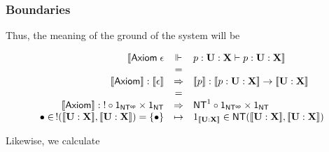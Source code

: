 \subsubsection{Boundaries}


Thus, the meaning of the ground of the system will be

$$\begin{array}{rcl}
  \ldb \mathsf{Axiom}\; \epsilon & \Vdash & p : \mathbf{U} : \mathbf {X} \vdash p : \mathbf{U} : \mathbf {X} \rdb \\
  & = & \\
  \meaningof{\mathsf{Axiom}} : \meaningof{\epsilon} & \Rightarrow & \meaningof{p} : \meaningof{p : \mathbf{U : X}} \to \meaningof{\mathbf{U : X}} \\
 & = & \\
  \meaningof{\mathsf{Axiom}} : \mathsf{!} \circ \mathsf{1}_{\mathsf{NT^{op}}} \times \mathsf{1}_{\mathsf{NT}} & \Rightarrow & \mathsf{NT}^{1} \circ \mathsf{1}_{\mathsf{NT^{op}}} \times \mathsf{1}_{\mathsf{NT}} \\
	\bullet \in \, !(\meaningof{\mathbf{U} : \mathbf{X}}, \meaningof{\mathbf{U} : \mathbf{X}}) = \{\bullet \}& \mapsto & 1_{\meaningof{\mathbf{U} : \mathbf{X}}} \in \mathsf{NT}(\meaningof{\mathbf{U} : \mathbf{X}}, \meaningof{\mathbf{U} : \mathbf{X}})
\end{array}$$

Likewise, we calculate

